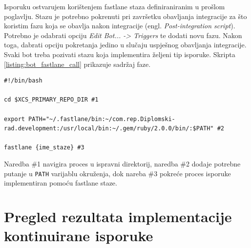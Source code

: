 \documentclass[times, utf8, diplomski, numeric]{fer}
\newcommand{\eng}[1]{(engl. \textit{#1})}
\begin{document}
Isporuku ostvarujem korištenjem fastlane staza definiraniranim u prošlom poglavlju. Stazu je potrebno pokrenuti pri završetku obavljanja integracije za što koristim fazu koja se obavlja nakon integracije \eng{Post-integration script}. Potrebno je odabrati opciju \textit{Edit Bot... -> Triggers} te dodati novu fazu. Nakon toga, dabrati opciju pokretanja jedino u slučaju uspješnog obavljanja integracije. Svaki bot treba pozivati stazu koja implementira željeni tip isporuke. Skripta \ref{listing:bot_fastlane_call} prikazuje sadržaj faze.

\begin{lstlisting}[caption=Sadržaj faze nakon obavljanja isporuke, label=listing:bot_fastlane_call]
#!/bin/bash

cd $XCS_PRIMARY_REPO_DIR #1

export PATH="~/.fastlane/bin:~/com.rep.Diplomski-rad.development:/usr/local/bin:~/.gem/ruby/2.0.0/bin/:$PATH" #2

fastlane {ime_staze} #3
\end{lstlisting}

Naredba \#1 navigira proces u ispravni direktorij, naredba \#2 dodaje potrebne putanje u \verb|PATH| varijablu okruženja, dok nareba \#3 pokreće proces isporuke implementiran pomoću fastlane staze.

\section{Pregled rezultata implementacije kontinuirane isporuke}
\end{document}
